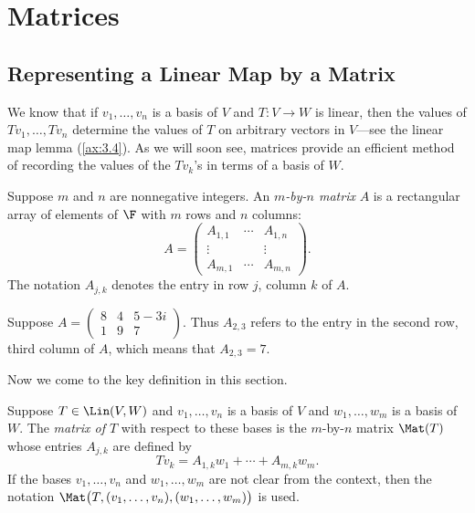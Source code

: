 \iftestbuild %
\setcounter{section}{2}\setcounter{theorem}{28}
\fi %
\section{Matrices}

\subsection{Representing a Linear Map by a Matrix}

We know that if $v_1,\dots,v_n$ is a basis of $V$ and $T\colon V\to W$ is
linear, then the values of $Tv_1,\dots,Tv_n$ determine the values of $T$ on
arbitrary vectors in $V$---see the linear map lemma (\ref{ax:3.4}). As we will
soon see, matrices provide an efficient method of recording the values of the
$Tv_k$'s in terms of a basis of $W$.

\begin{definition}[Matrix, $A_{j,k}$]\label{ax:3.29}
Suppose $m$ and $n$ are nonnegative integers. An \emph{$m$-by-$n$ matrix} $A$
is a rectangular array of elements of $\F$ with $m$ rows and $n$ columns:
\[ A = \begin{pmatrix} A_{1,1} & \cdots & A_{1,n}\\ \vdots & & \vdots\\
   A_{m,1} & \cdots & A_{m,n} \end{pmatrix}. \]
The notation $A_{j,k}$ denotes the entry in row $j$, column $k$ of $A$.
\end{definition}

%
\begin{example}\label{ax:3.30}
Suppose $A = \begin{pmatrix} 8 & 4 & 5-3i\\ 1 & 9 & 7 \end{pmatrix}$.
Thus $A_{2,3}$ refers to the entry in the second row, third column of $A$,
which means that $A_{2,3}=7$.
\end{example}

Now we come to the key definition in this section.

\begin{definition}\label{ax:3.31}
Suppose $T\in\Lin(V,W)$ and $v_1,\dots,v_n$ is a basis of $V$ and
$w_1,\dots,w_m$ is a basis of $W$. The \emph{matrix of $T$} with respect to
these bases is the $m$-by-$n$ matrix $\Mat(T)$ whose entries $A_{j,k}$ are
defined by
\[ Tv_k = A_{1,k}w_1+\cdots+A_{m,k}w_m. \]
If the bases $v_1,\dots,v_n$ and $w_1,\dots,w_m$ are not clear from the
context, then the notation $\Mat\bigl(T,(v_1,\dots,v_n),(w_1,\dots,w_m)\bigr)$
is used.
\end{definition}

